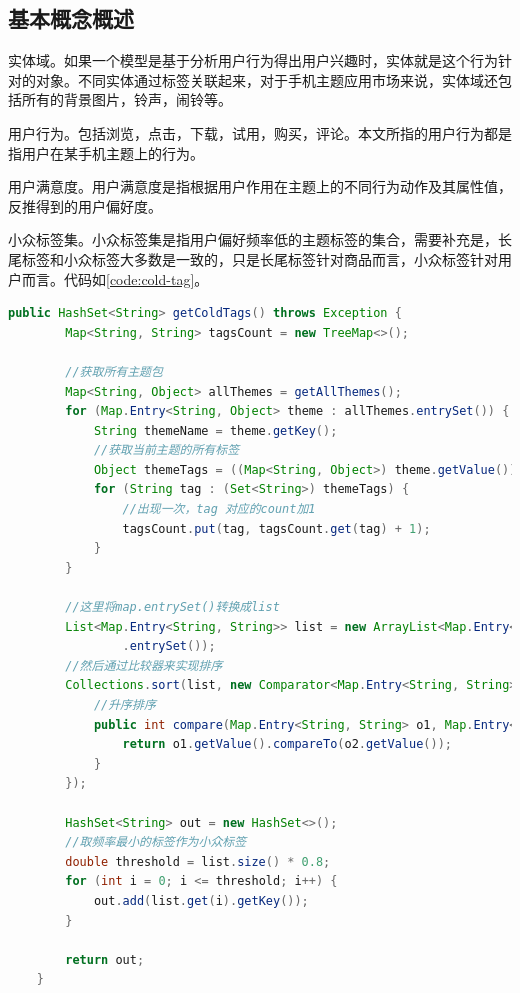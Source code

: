   \subsection{基本概念概述}
  实体域。如果一个模型是基于分析用户行为得出用户兴趣时，实体就是这个行为针对的对象。不同实体通过标签关联起来，对于手机主题应用市场来说，实体域还包括所有的背景图片，铃声，闹铃等。

  用户行为。包括浏览，点击，下载，试用，购买，评论。本文所指的用户行为都是指用户在某手机主题上的行为。

  用户满意度。用户满意度是指根据用户作用在主题上的不同行为动作及其属性值，反推得到的用户偏好度。

  小众标签集。小众标签集是指用户偏好频率低的主题标签的集合，需要补充是，长尾标签和小众标签大多数是一致的，只是长尾标签针对商品而言，小众标签针对用户而言。代码如\autoref{code:cold-tag}。
  \begin{lstlisting}[language=java,firstnumber=1,label={code:cold-tag}, caption={小众标签集抽取算法}]
    public HashSet<String> getColdTags() throws Exception {
        Map<String, String> tagsCount = new TreeMap<>();

        //获取所有主题包
        Map<String, Object> allThemes = getAllThemes();
        for (Map.Entry<String, Object> theme : allThemes.entrySet()) {
            String themeName = theme.getKey();
            //获取当前主题的所有标签
            Object themeTags = ((Map<String, Object>) theme.getValue()).get("tags");
            for (String tag : (Set<String>) themeTags) {
                //出现一次，tag 对应的count加1
                tagsCount.put(tag, tagsCount.get(tag) + 1);
            }
        }

        //这里将map.entrySet()转换成list
        List<Map.Entry<String, String>> list = new ArrayList<Map.Entry<String, String>>(tagsCount
                .entrySet());
        //然后通过比较器来实现排序
        Collections.sort(list, new Comparator<Map.Entry<String, String>>() {
            //升序排序
            public int compare(Map.Entry<String, String> o1, Map.Entry<String, String> o2) {
                return o1.getValue().compareTo(o2.getValue());
            }
        });

        HashSet<String> out = new HashSet<>();
        //取频率最小的标签作为小众标签
        double threshold = list.size() * 0.8;
        for (int i = 0; i <= threshold; i++) {
            out.add(list.get(i).getKey());
        }

        return out;
    }
  \end{lstlisting}

